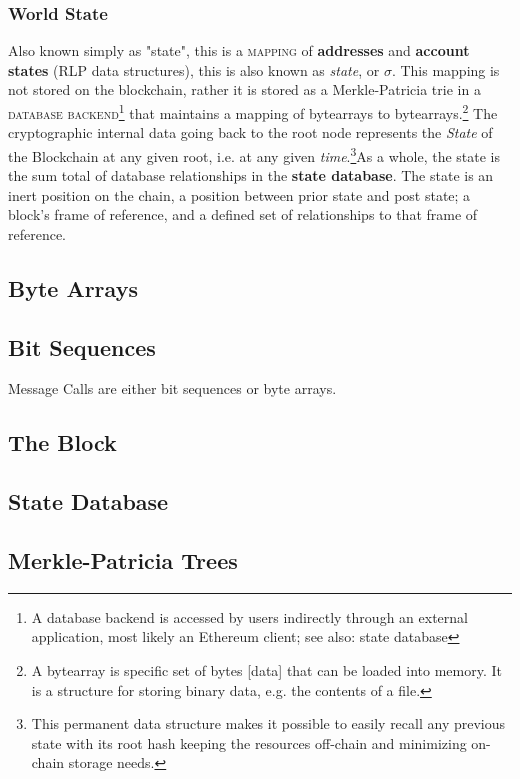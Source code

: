 \documentclass[10pt,a4paper,leqno,bibliography=totoc]{scrartcl}
\newenvironment{alphafootnotes}
{\par\edef\savedfootnotenumber{\number\value{footnote}}
\renewcommand{\thefootnote}{\alph{footnote}}
\setcounter{footnote}{0}}
{\par\setcounter{footnote}{\savedfootnotenumber}}
\begin{document}
\begin{alphafootnotes}
\begin{multicols*}{2}
				\subsubsection{World State}
					Also known simply as "state", this is a \textsc{mapping} of \textbf{addresses} and \textbf{account states} (RLP data structures), this is also known as \textit{state}, or $\sigma$. This mapping is not stored on the blockchain, rather it is stored as a Merkle-Patricia \gls{trie} in a \textsc{database backend}\footnote{A database backend is accessed by users indirectly through an external application, most likely an Ethereum client; see also: \gls{state database}} that maintains a mapping of bytearrays to bytearrays.\footnote{A bytearray is specific set of bytes [data] that can be loaded into memory. It is a structure for storing binary data, e.g. the contents of a file.} The cryptographic internal data going back to the \gls{root node} represents the \textit{State} of the Blockchain at any given root, i.e. at any given \textit{time}.\footnote{This permanent data structure makes it possible to easily recall any previous state with its root hash keeping the resources off-chain and minimizing on-chain storage needs.}As a whole, the state is the sum total of database relationships in the \textbf{ \gls{state database}}. The state is an inert position on the chain, a position between prior state and post state; a block's frame of reference, and a defined set of relationships to that frame of reference.


		\subsection{Byte Arrays}

		\subsection{Bit Sequences}
			Message Calls are either bit sequences or byte arrays.

		\subsection{The Block}

		\subsection{State Database}

		\subsection{Merkle-Patricia Trees}


\end{multicols*}
\end{alphafootnotes}
\end{document}
